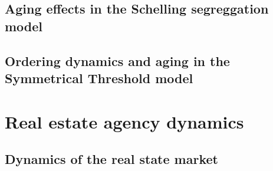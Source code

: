 \documentclass[
	11pt, %
	fleqn, %
	b5paper,
]{LegrandOrangeBook}
\begin{document}
\chapterspaceabove{6.75cm}
\chapterspacebelow{7.25cm}

\chapter{Aging effects in the Schelling segreggation model}


\chapterspaceabove{6.75cm}
\chapterspacebelow{7.25cm}

\chapter{Ordering dynamics and aging in the Symmetrical Threshold model}



\part{Real estate agency dynamics}

\chapterspaceabove{6.75cm}
\chapterspacebelow{7.25cm}

\chapter{Dynamics of the real state market}


\chapterspaceabove{6.75cm}
\chapterspacebelow{7.25cm}
\end{document}
